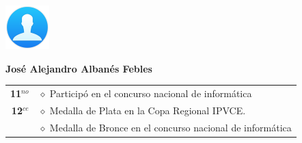 \begin{minipage}{0.2\textwidth}
	\includegraphics[width=\linewidth]{img/concursantes/user.png} %
\end{minipage}
\hfill
\begin{minipage}{0.7\textwidth}
	\textbf{José Alejandro Albanés Febles }
	
	\vspace*{0.1in}
	\begin{tabular}{rl}
		\textbf{11$^{no}$} & $\diamond$ Participó en el concurso nacional de informática \\
		
		\textbf{12$^{ce}$} 
		& $\diamond$ Medalla de Plata en la Copa Regional IPVCE.  \\
		&   $\diamond$ Medalla de Bronce en el concurso nacional de informática\\
		
		
	\end{tabular}
\end{minipage}

\vspace*{0.2in}

